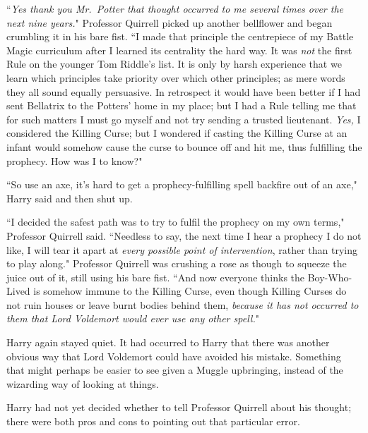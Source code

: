 ``\emph{Yes thank you Mr.~Potter that thought occurred to me several times over the next nine years.}" Professor Quirrell picked up another bellflower and began crumbling it in his bare fist. ``I made that principle the centrepiece of my Battle Magic curriculum after I learned its centrality the hard way. It was \emph{not} the first Rule on the younger Tom Riddle's list. It is only by harsh experience that we learn which principles take priority over which other principles; as mere words they all sound equally persuasive. In retrospect it would have been better if I had sent Bellatrix to the Potters' home in my place; but I had a Rule telling me that for such matters I must go myself and not try sending a trusted lieutenant. \emph{Yes,} I considered the Killing Curse; but I wondered if casting the Killing Curse at an infant would somehow cause the curse to bounce off and hit me, thus fulfilling the prophecy. How was I to know?"

``So use an axe, it's hard to get a prophecy-fulfilling spell backfire out of an axe," Harry said and then shut up.

``I decided the safest path was to try to fulfil the prophecy on my own terms," Professor Quirrell said. ``Needless to say, the next time I hear a prophecy I do not like, I will tear it apart at \emph{every possible point of intervention}, rather than trying to play along." Professor Quirrell was crushing a rose as though to squeeze the juice out of it, still using his bare fist. ``And now everyone thinks the Boy-Who-Lived is somehow immune to the Killing Curse, even though Killing Curses do not ruin houses or leave burnt bodies behind them, \emph{because it has not occurred to them that Lord Voldemort would ever use any other spell.}"

Harry again stayed quiet. It had occurred to Harry that there was another obvious way that Lord Voldemort could have avoided his mistake. Something that might perhaps be easier to see given a Muggle upbringing, instead of the wizarding way of looking at things.

Harry had not yet decided whether to tell Professor Quirrell about his thought; there were both pros and cons to pointing out that particular error.


